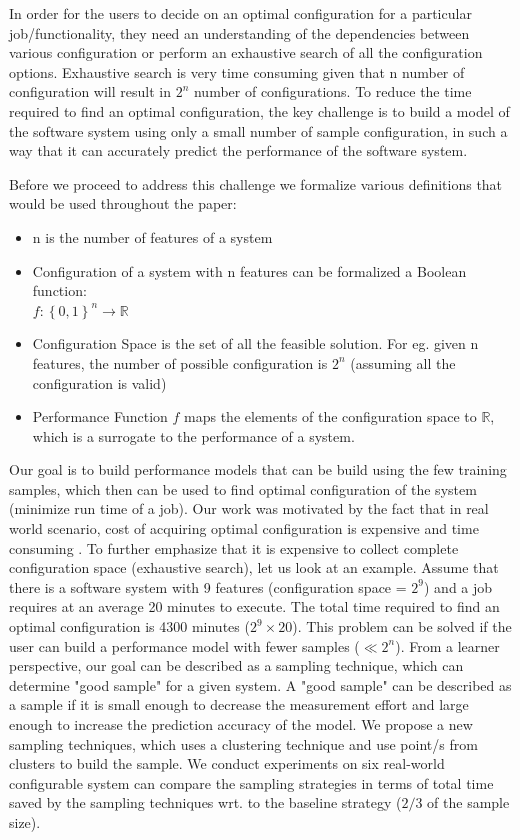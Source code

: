 \documentclass{sig-alternative}
\newcommand{\bi}{\begin{itemize}[leftmargin=0.4cm]}
\newcommand{\ei}{\end{itemize}}
\begin{document}
 In order for the users to decide on an optimal configuration for a particular job/functionality, they need an understanding of the dependencies between various configuration or perform an exhaustive search of all the configuration options. Exhaustive search is very time consuming given that n number of configuration will result in $2^n$ number of configurations. To reduce the time required to find an optimal configuration, the key challenge is to build a model of the software system using only a small number of sample configuration, in such a way that it can accurately predict the performance of the software system.
 
 Before we proceed to address this challenge we formalize various definitions that would be used throughout the paper:
 \bi
    \item{n is the number of features of a system}
    \item{Configuration of a system with n features can be formalized a Boolean function:\\
    \center
    $ f: \left\{{0,1}\right\}^n \to \mathbb{R}$
    }
    
    \item{Configuration Space is the set of all the feasible solution. For eg. given n features, the number of possible configuration is $2^n$ (assuming all the configuration is valid) }
    \item{Performance Function $f$ maps the elements of the configuration space to $\mathbb{R}$, which is a surrogate to the performance of a system.   }
 \ei
 
Our goal is to build performance models that can be build using the few training samples, which then can be used to find optimal configuration of the system (minimize run time of a job). Our work was motivated by the fact that in real world scenario, cost of acquiring optimal configuration is expensive and time consuming \cite{weiss2008maximizing}. To further emphasize that it is expensive to collect complete configuration space (exhaustive search), let us look at an example. Assume that there is a software system with 9 features (configuration space = $2^9$) and a job requires at an average 20 minutes to execute. The total time required to find an optimal configuration is 4300 minutes ($2^9 \times 20$). This problem can be solved if the user can build a performance model with fewer samples ($\ll 2^n$). From a learner perspective, our goal can be described as a sampling technique, which can determine "good sample" for a given system. A "good sample" can be described as a sample if it is small enough to decrease the measurement effort and large enough to increase the prediction accuracy of the model. We propose a new sampling techniques, which uses a clustering technique and use point/s from clusters to build the sample. We conduct experiments on six real-world configurable system can compare the sampling strategies in terms of total time saved by the sampling techniques wrt. to the baseline strategy ($2/3$ of the sample size).
\end{document}
